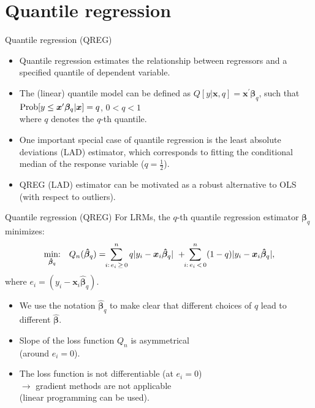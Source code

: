 \documentclass{beamer}
\begin{document}
\section{Quantile regression}
\begin{frame}{Quantile regression (QREG)}
\begin{itemize}
\item Quantile regression estimates the relationship between regressors and a specified quantile of dependent variable.
\medskip
\item The (linear) quantile model can be defined as $Q[y|\bm{x}, q]=\bm{x}^{\prime}\bm{\beta}_q$, such that $\textnormal{Prob}[y \le \bm{x}^{\prime}\bm{\beta}_q|\bm{x}]=q$, $0<q<1$ \\where $q$ denotes the $q$-th quantile.
\medskip
\item One important special case of quantile regression is the least absolute deviations (LAD) estimator, which corresponds to fitting the conditional median of the response variable ($q=\frac{1}{2}$).
\medskip
\item QREG (LAD) estimator can be motivated as a robust  alternative to OLS (with respect to outliers).
\end{itemize}
\end{frame}
\begin{frame}{Quantile regression (QREG)}
For LRMs, the $q$-th quantile regression estimator $\bm{\beta}_q$ minimizes:
$$
\underset{\bm{\hat{\beta}}_q}{\textnormal{min:}} \quad Q_n(\bm{\hat{\beta}}_q) =
\! \! \sum^n_{i:\, e_i \, \geq \, 0} q|y_i - \bm{x}_i\bm{\hat{\beta}}_q| \,\, +
\! \! \sum^n_{i:\, e_i\, < \, 0} (1-q)|y_i - \bm{x}_i\bm{\hat{\beta}}_q|,
$$
where $e_i = (y_i - \bm{x}_i\bm{\hat{\beta}}_q)$.

\begin{itemize}
    \item We use the notation $\bm{\hat{\beta}}_q$ to make clear that different choices of $q$ lead to different  $\bm{\hat{\beta}}$.
    \item Slope of the loss function $Q_n$ is asymmetrical \\(around $e_i=0$).
    \item The loss function is not differentiable (at $e_i=0$) \\$\rightarrow$ gradient methods are not applicable \\(linear programming can be used).
\end{itemize}
\end{frame}
\end{document}
